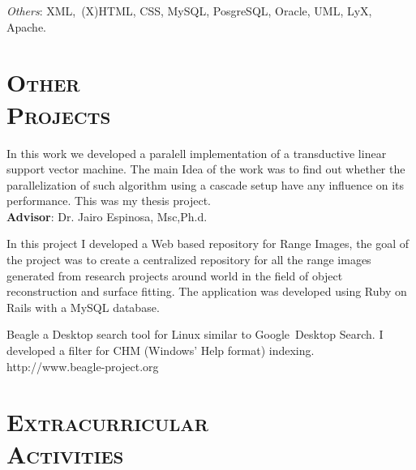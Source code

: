 \begin{resume}
\emph{Others}: XML,\ (X)HTML, CSS, MySQL, PosgreSQL, Oracle, UML, LyX, Apache.


\section{\textsc{Other\\  Projects}}

\begin{position}
In this work we developed a paralell implementation of a transductive
linear support vector machine. The main Idea of the work was
to find out whether the parallelization of such algorithm using a cascade
setup have any influence on its performance. This was my thesis project.\\
\textbf{Advisor}:  Dr. Jairo Espinosa, Msc,Ph.d.
\end{position}

\begin{position}
 In this project I developed a Web based repository for Range Images, the goal of the
 project was to create a centralized repository for all the range
 images generated from research projects around world in the field of
 object reconstruction and surface fitting. The application was
 developed using Ruby on Rails with a MySQL database.
\end{position}

\begin{position}
Beagle a Desktop search tool  for Linux similar to
Google\texttrademark  \  Desktop
Search. I developed a filter for CHM (Windows' Help format) indexing.
http://www.beagle-project.org
\end{position}

\section{\textsc{Extracurricular\\ Activities}}

\begin{formatb}
  \\
   

\end{formatb}
\end{resume}
